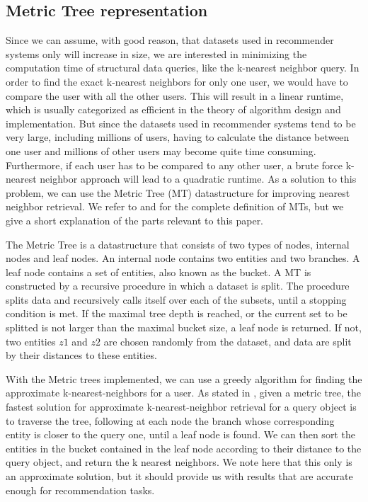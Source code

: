 \subsection{Metric Tree representation}\label{Metric_Tree_rep}
  Since we can assume, with good reason, that datasets used in recommender systems only will increase in size, we are interested in minimizing the computation time of structural data queries, like the k-nearest neighbor query.
  In order to find the exact k-nearest neighbors for only one user, we would have to compare the user with all the other users.
  This will result in a linear runtime, which is usually categorized as efficient in the theory of algorithm design and implementation. But since the datasets used in recommender systems tend to be very large, including millions of users, having to calculate the distance between one user and millions of other users may become quite time consuming.
  Furthermore, if each user has to be compared to any other user, a brute force k-nearest neighbor approach will lead to a quadratic runtime.
  As a solution to this problem, we can use the Metric Tree (MT) datastructure for improving nearest neighbor retrieval.
  We refer to \cite{jaeger2019counts} and \cite{uhlmann1991} for the complete definition of MTs, but we give a short explanation of the parts relevant to this paper.

  The Metric Tree is a datastructure that consists of two types of nodes, internal nodes and leaf nodes. An internal node contains two entities and two branches. A leaf node contains a set of entities, also known as the bucket.
  A MT is constructed by a recursive procedure in which a dataset is split. The procedure splits data and recursively calls itself over each of the subsets, until a stopping condition is met.
  If the maximal tree depth is reached, or the current set to be splitted is not larger than the maximal bucket size, a leaf node is returned.
  If not, two entities $z1$ and $z2$ are chosen randomly from the dataset, and data are split by their distances to these entities.

  With the Metric trees implemented, we can use a greedy algorithm for finding the approximate k-nearest-neighbors for a user.
  As stated in \cite{jaeger2019counts}, given a metric tree, the fastest solution for approximate k-nearest-neighbor retrieval for a query object is to traverse the tree, following at each node the branch whose corresponding entity is closer to the query one, until a leaf node is found.
  We can then sort the entities in the bucket contained in the leaf node according to their distance to the query object, and return the k nearest neighbors. We note here that this only is an approximate solution, but it should provide us with results that are accurate enough for recommendation tasks.
